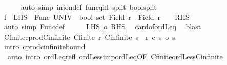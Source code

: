 \begin{isabellebody}
\ \ \ \ \isamarkupfalse%
\ {\isacharparenleft}{\kern0pt}auto\ simp{\isacharcolon}{\kern0pt}\ inj{\isacharunderscore}{\kern0pt}on{\isacharunderscore}{\kern0pt}def\ fun{\isacharunderscore}{\kern0pt}eq{\isacharunderscore}{\kern0pt}iff\ split{\isacharcolon}{\kern0pt}\ bool{\isachardot}{\kern0pt}split{\isacharparenright}{\kern0pt}\isanewline
\ \ \isamarkupfalse%
\isanewline
\ \ \isamarkupfalse%
\ {\isachardoublequoteopen}{\isacharquery}{\kern0pt}f\ {\isacharbackquote}{\kern0pt}\ {\isacharquery}{\kern0pt}LHS\ {\isasymsubseteq}\ Func\ {\isacharparenleft}{\kern0pt}UNIV\ {\isacharcolon}{\kern0pt}{\isacharcolon}{\kern0pt}\ bool\ set{\isacharparenright}{\kern0pt}\ {\isacharparenleft}{\kern0pt}Field\ r{}\ {\isacharless}{\kern0pt}{\isacharplus}{\kern0pt}{\isachargreater}{\kern0pt}\ Field\ r{}{\isacharparenright}{\kern0pt}{\isachardoublequoteclose}\ {\isacharparenleft}{\kern0pt}\ {\isachardoublequoteopen}{\isacharunderscore}{\kern0pt}\ {\isasymsubseteq}\ {\isacharquery}{\kern0pt}RHS{\isachardoublequoteclose}{\isacharparenright}{\kern0pt}\isanewline
\ \ \ \ \isamarkupfalse%
\ {\isacharparenleft}{\kern0pt}auto\ simp{\isacharcolon}{\kern0pt}\ Func{\isacharunderscore}{\kern0pt}def{\isacharparenright}{\kern0pt}\isanewline
\ \ \isamarkupfalse%
\ \isamarkupfalse%
\ {\isachardoublequoteopen}{\isacharbar}{\kern0pt}{\isacharquery}{\kern0pt}LHS{\isacharbar}{\kern0pt}\ {\isasymle}o\ {\isacharbar}{\kern0pt}{\isacharquery}{\kern0pt}RHS{\isacharbar}{\kern0pt}{\isachardoublequoteclose}\ \isamarkupfalse%
\ card{\isacharunderscore}{\kern0pt}of{\isacharunderscore}{\kern0pt}ordLeq\ \isamarkupfalse%
\ blast\isanewline
{}\isamarkupfalse%
%
\endisatagproof
{\isafoldproof}%
%
\isadelimproof
\isanewline
%
\endisadelimproof
\isanewline
{}\isamarkupfalse%
\ Cfinite{\isacharunderscore}{\kern0pt}cprod{\isacharunderscore}{\kern0pt}Cinfinite{\isacharcolon}{\kern0pt}\ {\isachardoublequoteopen}{\isasymlbrakk}Cfinite\ r{\isacharsemicolon}{\kern0pt}\ Cinfinite\ s{\isasymrbrakk}\ {\isasymLongrightarrow}\ r\ {\isacharasterisk}{\kern0pt}c\ s\ {\isasymle}o\ s{\isachardoublequoteclose}\isanewline
%
\isadelimproof
%
\endisadelimproof
%
\isatagproof
{}\isamarkupfalse%
\ {\isacharparenleft}{\kern0pt}intro\ cprod{\isacharunderscore}{\kern0pt}cinfinite{\isacharunderscore}{\kern0pt}bound{\isacharparenright}{\kern0pt}\isanewline
\ \ {\isacharparenleft}{\kern0pt}auto\ intro{\isacharcolon}{\kern0pt}\ ordLeq{\isacharunderscore}{\kern0pt}refl\ ordLess{\isacharunderscore}{\kern0pt}imp{\isacharunderscore}{\kern0pt}ordLeq{\isacharbrackleft}{\kern0pt}OF\ Cfinite{\isacharunderscore}{\kern0pt}ordLess{\isacharunderscore}{\kern0pt}Cinfinite{\isacharbrackright}{\kern0pt}{\isacharparenright}{\kern0pt}%

\end{isabellebody}
